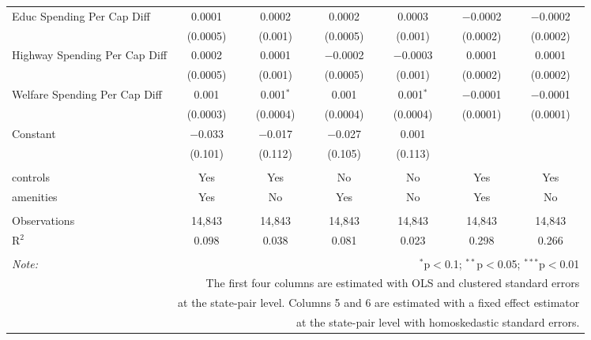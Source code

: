 \begin{table}[!htbp]
\begin{tabular}{@{\extracolsep{5pt}}lcccccc}
  Educ Spending Per Cap Diff & 0.0001 & 0.0002 & 0.0002 & 0.0003 & $-$0.0002 & $-$0.0002 \\ 
  & (0.0005) & (0.001) & (0.0005) & (0.001) & (0.0002) & (0.0002) \\ 
  Highway Spending Per Cap Diff & 0.0002 & 0.0001 & $-$0.0002 & $-$0.0003 & 0.0001 & 0.0001 \\ 
  & (0.0005) & (0.001) & (0.0005) & (0.001) & (0.0002) & (0.0002) \\ 
  Welfare Spending Per Cap Diff & 0.001 & 0.001$^{*}$ & 0.001 & 0.001$^{*}$ & $-$0.0001 & $-$0.0001 \\ 
  & (0.0003) & (0.0004) & (0.0004) & (0.0004) & (0.0001) & (0.0001) \\ 
  Constant & $-$0.033 & $-$0.017 & $-$0.027 & 0.001 &  &  \\ 
  & (0.101) & (0.112) & (0.105) & (0.113) &  &  \\ 
 \hline \\[-1.8ex] 
controls & Yes & Yes & No & No & Yes & Yes \\ 
amenities & Yes & No & Yes & No & Yes & No \\ 
\hline \\[-1.8ex] 
Observations & 14,843 & 14,843 & 14,843 & 14,843 & 14,843 & 14,843 \\ 
R$^{2}$ & 0.098 & 0.038 & 0.081 & 0.023 & 0.298 & 0.266 \\ 
\hline 
\hline \\[-1.8ex] 
\textit{Note:}  & \multicolumn{6}{r}{$^{*}$p$<$0.1; $^{**}$p$<$0.05; $^{***}$p$<$0.01} \\ 
 & \multicolumn{6}{r}{The first four columns are estimated with OLS and clustered standard errors} \\ 
 & \multicolumn{6}{r}{at the state-pair level. Columns 5 and 6 are estimated with a fixed effect estimator} \\ 
 & \multicolumn{6}{r}{at the state-pair level with homoskedastic standard errors.} \\ 
\end{tabular} 
\end{table} 
